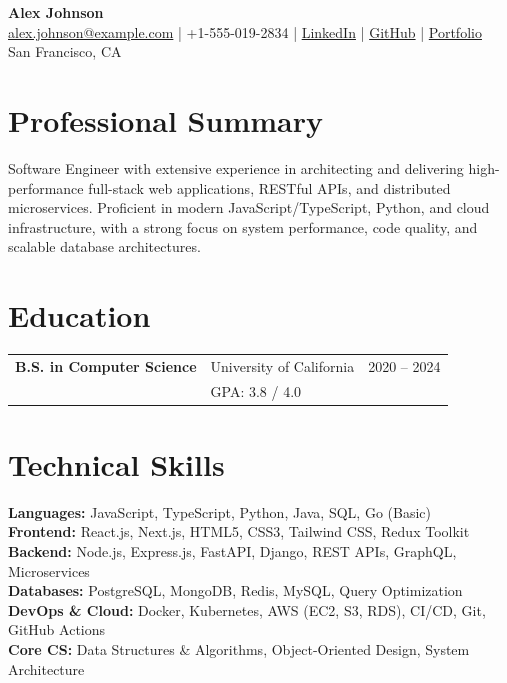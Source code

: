\documentclass[10pt,a4paper]{article}
\begin{document}
\begin{center}
    {\LARGE \textbf{Alex Johnson}} \\
    \href{mailto:alex.johnson@example.com}{alex.johnson@example.com} \;|\;
    +1-555-019-2834 \;|\;
    \href{https://www.linkedin.com}{LinkedIn} \;|\;
    \href{https://github.com}{GitHub} \;|\;
    \href{https://portfolio.example.com}{Portfolio} \\
    San Francisco, CA
\end{center}

\section*{Professional Summary}
Software Engineer with extensive experience in architecting and delivering high-performance full-stack web applications, RESTful APIs, and distributed microservices. Proficient in modern JavaScript/TypeScript, Python, and cloud infrastructure, with a strong focus on system performance, code quality, and scalable database architectures.

\section*{Education}
\begin{tabularx}{\textwidth}{@{} l X r @{}}
\textbf{B.S. in Computer Science} & University of California & 2020 -- 2024 \\
 & GPA: 3.8 / 4.0 & \\[0.1em]
\end{tabularx}

\section*{Technical Skills}
\textbf{Languages:} JavaScript, TypeScript, Python, Java, SQL, Go (Basic) \\
\textbf{Frontend:} React.js, Next.js, HTML5, CSS3, Tailwind CSS, Redux Toolkit \\
\textbf{Backend:} Node.js, Express.js, FastAPI, Django, REST APIs, GraphQL, Microservices \\
\textbf{Databases:} PostgreSQL, MongoDB, Redis, MySQL, Query Optimization \\
\textbf{DevOps \& Cloud:} Docker, Kubernetes, AWS (EC2, S3, RDS), CI/CD, Git, GitHub Actions \\
\textbf{Core CS:} Data Structures \& Algorithms, Object-Oriented Design, System Architecture
\end{document}
